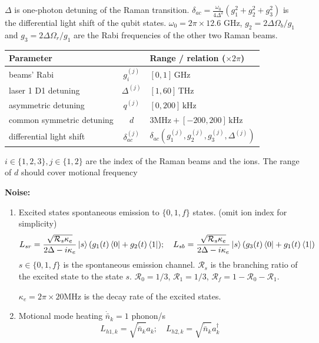 \documentclass{simple-notes}
\begin{document}
\begin{notebox}[title=System Receipt]
$\Delta$ is one-photon detuning of the Raman transition.
$\delta_{ac} = \frac{\omega_0}{4\Delta^2}(g_1^2 + g_2^2 + g_3^2)$ is the differential light shift of the qubit states.
$\omega_0 = 2\pi \times 12.6$ GHz, $g_2 = 2\Delta\Omega_b/g_1$ and $g_3 = 2\Delta\Omega_r/g_1$ are the Rabi frequencies of the other two Raman beams.
\begin{center}
    \begin{tabular}{|lc|l|}
        \hline
        \textbf{Parameter} && \textbf{Range / relation} ($\times 2\pi$) \\
        \hline
        beams' Rabi &$g_i^{(j)}$ & $[0,1]\,\mathrm{GHz}$\\
        \hline
        laser 1 D1 detuning &$\Delta^{(j)}$ & $[1,60] \,\mathrm{THz}$\\
        asymmetric detuning &$q^{(j)}$ & $[0,200]\,\mathrm{kHz}$ \\
        common symmetric detuning &$d$ & $3\mathrm{MHz} +[-200,200]\,\mathrm{kHz}$ \\
        \hline
        differential light shift &$\delta_{ac}^{(j)}$ & $\delta_{ac}(g_1^{(j)},g_2^{(j)},g_3^{(j)}, \Delta^{(j)})$\\
        \hline
    \end{tabular}
\end{center}
$i\in \{1,2,3\}, j\in \{1,2\}$ are the index of the Raman beams and the ions. The range of $d$ should cover motional frequency

\textbf{Noise:}
\begin{enumerate}
    \item Excited states spontaneous emission to $\{0,1,f\}$ states. (omit ion index for simplicity)
\begin{equation}
    L_{sr} = \frac{\sqrt{\mathcal{R}_s\kappa_e}}{2\Delta - i\kappa_e}\ket{s}(g_1(t)\bra{0} + g_2(t)\bra{1});\quad L_{sb} = \frac{\sqrt{\mathcal{R}_s\kappa_e}}{2\Delta - i\kappa_e}\ket{s}(g_3(t)\bra{0} + g_1(t)\bra{1})
\end{equation}
$s\in\{0,1,f\}$ is the spontaneous emission channel. $\mathcal{R}_s$ is the branching ratio of the excited state to the state $s$. $\mathcal{R}_0 = 1/3$, $\mathcal{R}_1 = 1/3$, $\mathcal{R}_f = 1 - \mathcal{R}_0 - \mathcal{R}_1$.

$\kappa_e = 2\pi \times 20 \mathrm{MHz}$ is the decay rate of the excited states.
    \item Motional mode heating $\dot{\bar{n}}_k = 1$ phonon/s
\begin{equation}
    L_{h1,k} = \sqrt{\dot{\bar{n}}_k} a_k;\quad L_{h2,k} = \sqrt{\dot{\bar{n}}_k} a_k^\dagger
\end{equation}
\end{enumerate}


\end{notebox}
\end{document}
